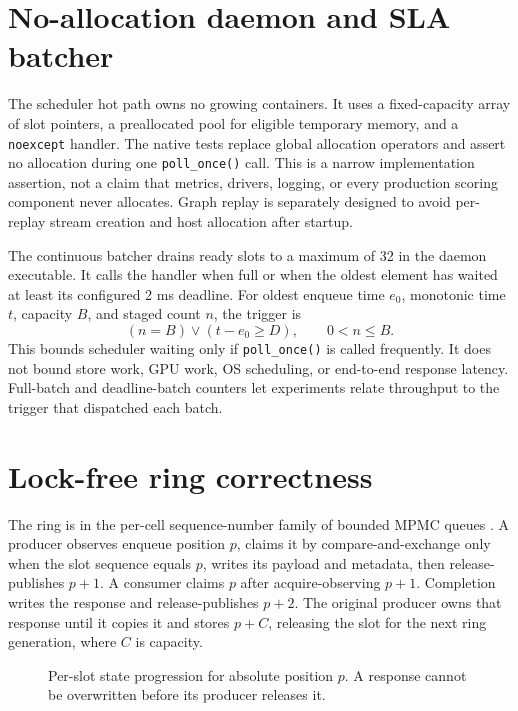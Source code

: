 \documentclass[10pt,a4paper,twocolumn]{article}
\newcommand{\code}[1]{\texttt{#1}}
\begin{document}
\section{No-allocation daemon and SLA batcher}
The scheduler hot path owns no growing containers. It uses a fixed-capacity array
of slot pointers, a preallocated pool for eligible temporary memory, and a
\code{noexcept} handler. The native tests replace global allocation operators
and assert no allocation during one \code{poll\_once()} call. This is a narrow
implementation assertion, not a claim that metrics, drivers, logging, or every
production scoring component never allocates. Graph replay is separately
designed to avoid per-replay stream creation and host allocation after startup.

The continuous batcher drains ready slots to a maximum of 32 in the daemon
executable. It calls the handler when full or when the oldest element has waited
at least its configured 2 ms deadline. For oldest enqueue time $e_0$, monotonic
time $t$, capacity $B$, and staged count $n$, the trigger is
\[
(n=B)\lor(t-e_0\geq D),\qquad 0<n\leq B .
\]
This bounds scheduler waiting only if \code{poll\_once()} is called frequently.
It does not bound store work, GPU work, OS scheduling, or end-to-end response
latency. Full-batch and deadline-batch counters let experiments relate throughput
to the trigger that dispatched each batch.

\section{Lock-free ring correctness}
The ring is in the per-cell sequence-number family of bounded MPMC queues
\cite{lamport1977,michael1996}. A producer observes enqueue position $p$, claims
it by compare-and-exchange only when the slot sequence equals $p$, writes its
payload and metadata, then release-publishes $p+1$. A consumer claims $p$ after
acquire-observing $p+1$. Completion writes the response and release-publishes
$p+2$. The original producer owns that response until it copies it and stores
$p+C$, releasing the slot for the next ring generation, where $C$ is capacity.

\begin{figure}[t]\centering
{}
\caption{Per-slot state progression for absolute position $p$. A response cannot be overwritten before its producer releases it.}\label{fig:ring}
\end{figure}
\end{document}
